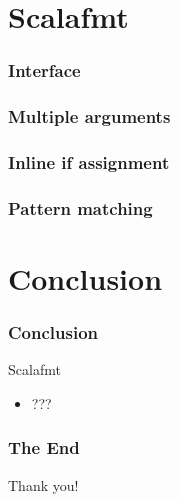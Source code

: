 \documentclass[xcolor=dvipsnames]{beamer}
\theoremstyle{definition}
\begin{document}
\section{Scalafmt} %
\label{sec:Scalafmt}

\begin{frame}[fragile]
    \frametitle{Interface}
    \begin{block}{}
        
        
    \end{block}
\end{frame}

\begin{frame}[fragile]
    \frametitle{Multiple arguments}
    \begin{block}{}
        
    \end{block}
\end{frame}

\begin{frame}[fragile]
    \frametitle{Inline if assignment}
    \begin{block}{}
        
    \end{block}
\end{frame}

\begin{frame}[fragile]
    \frametitle{Pattern matching}
    \begin{block}{}
        
    \end{block}
\end{frame}

\section{Conclusion} %
\label{sec:Conclusion}

\begin{frame}[fragile]
    \frametitle{Conclusion}
    \begin{block}{Scalafmt}
        \begin{itemize}
            \item ???
        \end{itemize}
    \end{block}
\end{frame}

\begin{frame}[fragile]
    \frametitle{The End}
    \begin{center}
        \Huge
        Thank you!
    \end{center}
\end{frame}

\end{document}
